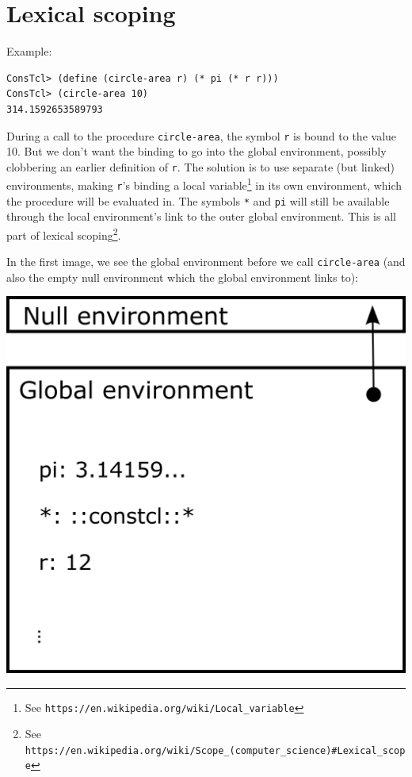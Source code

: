 \documentclass[twoside,9pt]{report}
\begin{document}
\section{Lexical scoping}
\label{lexical-scoping}


Example:

\begin{verbatim}
ConsTcl> (define (circle-area r) (* pi (* r r)))
ConsTcl> (circle-area 10)
314.1592653589793
\end{verbatim}


During a call to the procedure \texttt{circle-area}, the symbol \texttt{r} is bound to the value 10. But we don't want the binding to go into the global environment, possibly clobbering an earlier definition of \texttt{r}. The solution is to use separate (but linked) environments, making \texttt{r}'s binding a local variable\footnote{See \texttt{https://en.wikipedia.org/wiki/Local\_variable}} in its own environment, which the procedure will be evaluated in. The symbols \texttt{*} and \texttt{pi} will still be available through the local environment's link to the outer global environment. This is all part of lexical scoping\footnote{See \texttt{https://en.wikipedia.org/wiki/Scope\_(computer\_science)\#Lexical\_scope}}.


In the first image, we see the global environment before we call \texttt{circle-area} (and also the empty null environment which the global environment links to):

\includegraphics{images/env1.png}
\end{document}
